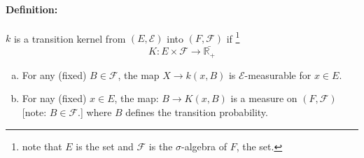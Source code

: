 \documentclass[11pt]{article}
\newcommand{\m}{\mathcal}
\newcommand{\R}{{\mathbb R}}
\begin{document}
        \paragraph{Definition: } $k$ is a transition kernel from $(E, \m E)$ into $(F,
        \m F)$ if \footnote{
        note that $E$ is the set and $\m F$ is the $\sigma$-algebra of $F$, the set.}
        \[
          K : E\times \m F \to \bar {\R_+}
        \]
        \begin{enumerate}[(a)]
          \item For any (fixed) $B \in \m F$, the map $X \to k(x, B)$ is $\m
            E$-measurable for $x \in E$. 
          \item For nay (fixed) $x \in E$, the map: 
            $B \to K(x, B)$ is a measure on $(F, \m F)$ [note: $B \in \m F$.]
            where $B$ defines the transition probability.
        \end{enumerate}
\end{document}
